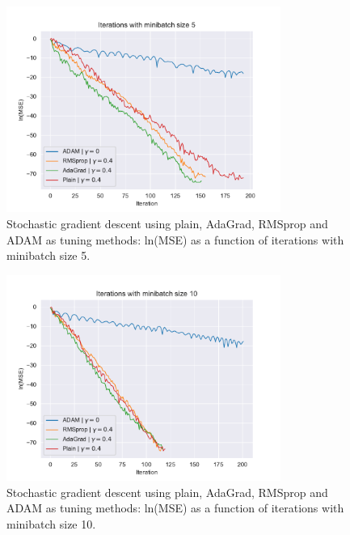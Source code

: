 \begin{figure}[H]
\centering
\includegraphics[width=0.8\textwidth]{Figures/PartA/minibatch_5_MSE(iter).pdf}
\caption{Stochastic gradient descent using plain, AdaGrad, RMSprop and ADAM as tuning methods: ln(MSE) as a function of iterations with minibatch size 5.}
\label{fig:minibatch_5_MSE-iter}
\end{figure}

\begin{figure}[H]
\centering
\includegraphics[width=0.8\textwidth]{Figures/PartA/minibatch_10_MSE(iter).pdf}
\caption{Stochastic gradient descent using plain, AdaGrad, RMSprop and ADAM as tuning methods: ln(MSE) as a function of iterations with minibatch size 10.}
\label{fig:minibatch_10_MSE-iter}
\end{figure}

